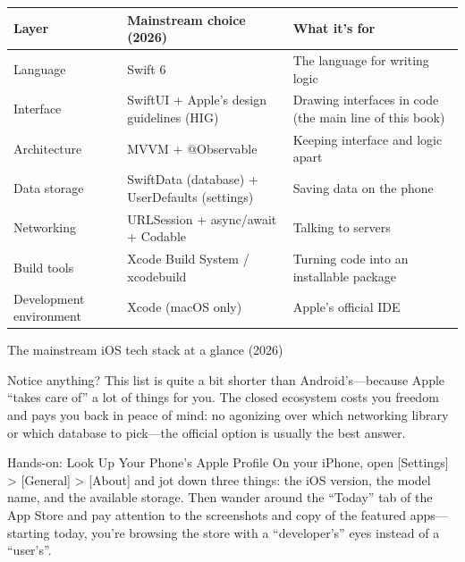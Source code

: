 
\begin{center}
\begin{tabularx}{\linewidth}{|X|X|X|}
\hline
\textbf{Layer} & \textbf{Mainstream choice (2026)} & \textbf{What it's for} \tabularnewline
\hline
Language & Swift 6 & The language for writing logic \tabularnewline
Interface & SwiftUI + Apple's design guidelines (HIG) & Drawing interfaces in code (the main line of this book) \tabularnewline
Architecture & MVVM + @Observable & Keeping interface and logic apart \tabularnewline
Data storage & SwiftData (database) + UserDefaults (settings) & Saving data on the phone \tabularnewline
Networking & URLSession + async/await + Codable & Talking to servers \tabularnewline
Build tools & Xcode Build System / xcodebuild & Turning code into an installable package \tabularnewline
Development environment & Xcode (macOS only) & Apple's official IDE \tabularnewline
\hline
\end{tabularx}
\end{center}

\begin{center}\small\color{gray}The mainstream iOS tech stack at a glance (2026)\end{center}

Notice anything? This list is quite a bit shorter than Android's—because Apple “takes care of” a lot of things for you. The closed ecosystem costs you freedom and pays you back in peace of mind: no agonizing over which networking library or which database to pick—the official option is usually the best answer.

\begin{tcbpractice}{Hands-on: Look Up Your Phone's Apple Profile}
On your iPhone, open [Settings] > [General] > [About] and jot down three things: the iOS version, the model name, and the available storage. Then wander around the “Today” tab of the App Store and pay attention to the screenshots and copy of the featured apps—starting today, you're browsing the store with a “developer's” eyes instead of a “user's”.

\end{tcbpractice}

